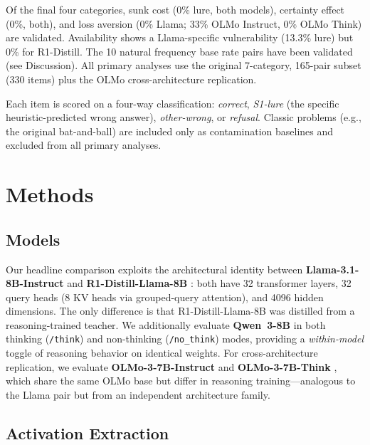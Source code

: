 \documentclass[twocolumn,10pt]{article}
\begin{document}
\noindent Of the final four categories, sunk cost (0\% lure, both
models), certainty effect (0\%, both), and loss aversion (0\% Llama;
33\% OLMo Instruct, 0\% OLMo Think) are validated.  Availability shows
a Llama-specific vulnerability (13.3\% lure) but 0\% for R1-Distill.
The 10 natural frequency base rate pairs have been validated (see
Discussion).  All primary analyses use the original 7-category,
165-pair subset (330 items) plus the OLMo cross-architecture
replication.

\noindent Each item is scored on a four-way classification: \emph{correct},
\emph{S1-lure} (the specific heuristic-predicted wrong answer),
\emph{other-wrong}, or \emph{refusal}.  Classic problems (e.g., the
original bat-and-ball) are included only as contamination baselines and
excluded from all primary analyses.


\section{Methods}
\label{sec:methods}

\subsection{Models}

Our headline comparison exploits the architectural identity between
\textbf{Llama-3.1-8B-Instruct} \citep{llama31} and
\textbf{R1-Distill-Llama-8B} \citep{deepseekr1}: both have 32
transformer layers, 32 query heads (8 KV heads via grouped-query
attention), and 4096 hidden dimensions.  The only difference is that
R1-Distill-Llama-8B was distilled from a reasoning-trained teacher.  We
additionally evaluate \textbf{Qwen~3-8B} in both thinking (\texttt{/think})
and non-thinking (\texttt{/no\_think}) modes, providing a
\emph{within-model} toggle of reasoning behavior on identical weights.
For cross-architecture replication, we evaluate
\textbf{OLMo-3-7B-Instruct} and \textbf{OLMo-3-7B-Think}
\citep{olmo3}, which share the same OLMo base but differ in reasoning
training---analogous to the Llama pair but from an independent
architecture family.

\subsection{Activation Extraction}
\end{document}
